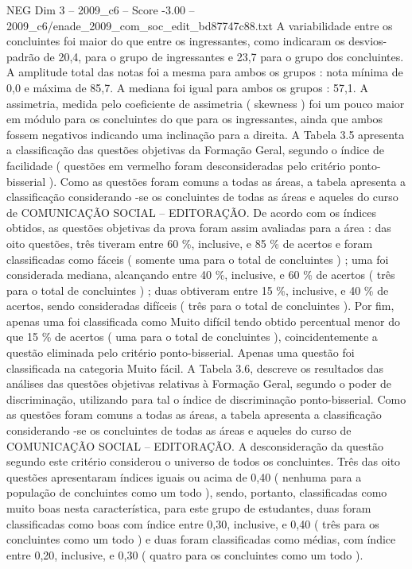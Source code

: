\begin{textsample}{NEG Dim 3 – 2009\_c6 – Score -3.00 – 2009\_c6/enade\_2009\_com\_soc\_edit\_bd87747c88.txt}
A variabilidade entre os concluintes foi maior do que entre os ingressantes, como indicaram os desvios-padrão de 20,4, para o grupo de ingressantes e 23,7 para o grupo dos concluintes.
A amplitude total das notas foi a mesma para ambos os grupos : nota mínima de 0,0 e máxima de 85,7.
A mediana foi igual para ambos os grupos : 57,1.
A assimetria, medida pelo coeficiente de assimetria ( skewness ) foi um pouco maior em módulo para os concluintes do que para os ingressantes, ainda que ambos fossem negativos indicando uma inclinação para a direita.
A Tabela 3.5 apresenta a classificação das questões objetivas da Formação Geral, segundo o índice de facilidade ( questões em vermelho foram desconsideradas pelo critério ponto-bisserial ).
Como as questões foram comuns a todas as áreas, a tabela apresenta a classificação considerando -se os concluintes de todas as áreas e aqueles do curso de COMUNICAÇÃO SOCIAL – EDITORAÇÃO.
De acordo com os índices obtidos, as questões objetivas da prova foram assim avaliadas para a área : das oito questões, três tiveram entre 60 \%, inclusive, e 85 \% de acertos e foram classificadas como fáceis ( somente uma para o total de concluintes ) ; uma foi considerada mediana, alcançando entre 40 \%, inclusive, e 60 \% de acertos ( três para o total de concluintes ) ; duas obtiveram entre 15 \%, inclusive, e 40 \% de acertos, sendo consideradas difíceis ( três para o total de concluintes ).
Por fim, apenas uma foi classificada como Muito difícil tendo obtido percentual menor do que 15 \% de acertos ( uma para o total de concluintes ), coincidentemente a questão eliminada pelo critério ponto-bisserial.
Apenas uma questão foi classificada na categoria Muito fácil.
A Tabela 3.6, descreve os resultados das análises das questões objetivas relativas à Formação Geral, segundo o poder de discriminação, utilizando para tal o índice de discriminação ponto-bisserial.
Como as questões foram comuns a todas as áreas, a tabela apresenta a classificação considerando -se os concluintes de todas as áreas e aqueles do curso de COMUNICAÇÃO SOCIAL – EDITORAÇÃO.
A desconsideração da questão segundo este critério considerou o universo de todos os concluintes.
Três das oito questões apresentaram índices iguais ou acima de 0,40 ( nenhuma para a população de concluintes como um todo ), sendo, portanto, classificadas como muito boas nesta característica, para este grupo de estudantes, duas foram classificadas como boas com índice entre 0,30, inclusive, e 0,40 ( três para os concluintes como um todo ) e duas foram classificadas como médias, com índice entre 0,20, inclusive, e 0,30 ( quatro para os concluintes como um todo ).

\end{textsample}
